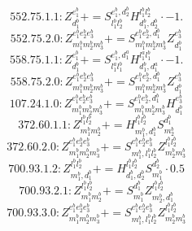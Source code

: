\documentclass[letterpaper,10pt,fleqn,leqno,onecolumn]{article}
\begin{document}
\begin{equation} \;\;\;\;\;\;  552.75.1.1: Z^{e_{1}^{b}}_{d_{1}^{b}}+=S^{e_{1}^{b},d_{2}^{b}}_{l_{1}^{b}l_{2}^{b}}H^{l_{1}^{b}l_{2}^{b}}_{d_{1}^{b},d_{2}^{b}}\cdot -1. \end{equation}
\begin{equation} \;\;\;\;\;\;  552.75.2.0: Z^{e_{1}^{b}e_{2}^{b}e_{3}^{b}}_{m_{1}^{b}m_{2}^{b}m_{3}^{b}}+=S^{e_{1}^{b}e_{2}^{b},d_{1}^{b}}_{m_{1}^{b}m_{2}^{b}m_{3}^{b}}Z^{e_{3}^{b}}_{d_{1}^{b}} \end{equation}
\begin{equation} \;\;\;\;\;\;  558.75.1.1: Z^{e_{1}^{b}}_{d_{1}^{b}}+=S^{e_{1}^{b},d_{1}^{a}}_{l_{1}^{a}l_{1}^{b}}H^{l_{1}^{a}l_{1}^{b}}_{d_{1}^{b},d_{1}^{a}}\cdot -1. \end{equation}
\begin{equation} \;\;\;\;\;\;  558.75.2.0: Z^{e_{1}^{b}e_{2}^{b}e_{3}^{b}}_{m_{1}^{b}m_{2}^{b}m_{3}^{b}}+=S^{e_{1}^{b}e_{2}^{b},d_{1}^{b}}_{m_{1}^{b}m_{2}^{b}m_{3}^{b}}Z^{e_{3}^{b}}_{d_{1}^{b}} \end{equation}
\begin{equation} \;\;\;\;\;\;  107.24.1.0: Z^{e_{1}^{b}e_{2}^{b}e_{3}^{b}}_{m_{1}^{b}m_{2}^{b}m_{3}^{b}}+=S^{e_{1}^{b}e_{2}^{b},d_{1}^{b}}_{m_{1}^{b}m_{2}^{b}m_{3}^{b}}H^{e_{3}^{b}}_{d_{1}^{b}} \end{equation}
\begin{equation} \;\;\;\;\;\;  372.60.1.1: Z^{l_{1}^{b}l_{2}^{b}}_{m_{1}^{b}m_{2}^{b}}+=H^{l_{1}^{b}l_{2}^{b}}_{m_{1}^{b},d_{1}^{b}}S^{d_{1}^{b}}_{m_{2}^{b}} \end{equation}
\begin{equation} \;\;\;\;\;\;  372.60.2.0: Z^{e_{1}^{b}e_{2}^{b}e_{3}^{b}}_{m_{1}^{b}m_{2}^{b}m_{3}^{b}}+=S^{e_{1}^{b}e_{2}^{b}e_{3}^{b}}_{m_{1}^{b},l_{1}^{b}l_{2}^{b}}Z^{l_{1}^{b}l_{2}^{b}}_{m_{2}^{b}m_{3}^{b}} \end{equation}
\begin{equation} \;\;\;\;\;\;  700.93.1.2: Z^{l_{1}^{b}l_{2}^{b}}_{m_{1}^{b},d_{1}^{b}}+=H^{l_{1}^{b}l_{2}^{b}}_{d_{1}^{b},d_{2}^{b}}S^{d_{2}^{b}}_{m_{1}^{b}}\cdot 0.5 \end{equation}
\begin{equation} \;\;\;\;\;\;  700.93.2.1: Z^{l_{1}^{b}l_{2}^{b}}_{m_{1}^{b}m_{2}^{b}}+=S^{d_{1}^{b}}_{m_{1}^{b}}Z^{l_{1}^{b}l_{2}^{b}}_{m_{2}^{b},d_{1}^{b}} \end{equation}
\begin{equation} \;\;\;\;\;\;  700.93.3.0: Z^{e_{1}^{b}e_{2}^{b}e_{3}^{b}}_{m_{1}^{b}m_{2}^{b}m_{3}^{b}}+=S^{e_{1}^{b}e_{2}^{b}e_{3}^{b}}_{m_{1}^{b},l_{1}^{b}l_{2}^{b}}Z^{l_{1}^{b}l_{2}^{b}}_{m_{2}^{b}m_{3}^{b}} \end{equation}
\end{document}
